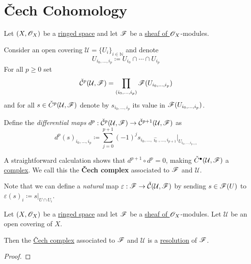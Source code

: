 \documentclass[../../main]{subfiles}
\begin{document}
\chapter{Čech Cohomology}

\begin{definition}\label{def:cech-complex}
  Let \((X, \mathscr{O}_{X})\) be a \hyperref[def:ringed-space]{ringed space} and let \(\mathscr{F}\) be a \hyperref[def:sheaf-of-modules]{sheaf of \(\mathscr{O}_{X}\)}-modules.

  Consider an open covering \(\mathcal{U} = \{U_{i}\}_{i \in \mathbb{N}}\) and denote
  \begin{equation*}
    U_{i_{0}, \ldots, i_{p}} \coloneq U_{i_{0}} \cap \cdots \cap U_{i_{p}}
  \end{equation*}
  For all \(p \geq 0\) set
  \begin{equation*}
    \check{\mathcal{C}}^{p}(\mathcal{U}, \mathscr{F}) = \prod_{(i_{0}, \ldots, i_{p})} \mathscr{F}(U_{i_{0}, \ldots, i_{p}})
  \end{equation*}
  and for all \(s \in \check{C}^{p}(\mathcal{U}, \mathscr{F})\) denote by \(s_{i_{0}, \ldots, i_{p}}\) its value in \(\mathscr{F}(U_{i_{0}, \ldots, i_{p}})\).

  Define the \textit{differential maps} \(d^{p}: \check{\mathcal{C}}^{p}(\mathcal{U}, \mathscr{F}) \to \check{\mathcal{C}}^{p+1}(\mathcal{U}, \mathscr{F})\) as
  \begin{equation*}
    d^{p}(s)_{i_{0}, \ldots, i_{p}} \coloneq \sum_{j=0}^{p+1} (-1)^{j} s_{i_{0}, \ldots, \hat{\imath_{0}}, \ldots, i_{p+1}}|_{U_{i_{0}, \ldots, i_{p+1}}}
  \end{equation*}

  A straightforward calculation shows that \(d^{p+1} \circ d^{p} = 0\), making \(\check{C}^{\bullet}(\mathcal{U}, \mathscr{F})\) a \hyperref[def:complex]{complex}.
  We call this the \textbf{\v{C}ech complex} associated to \(\mathscr{F}\) and \(\mathcal{U}\).

  Note that we can define a \textit{natural} map \(\varepsilon: \mathscr{F} \to \check{\mathcal{C}}(\mathcal{U}, \mathscr{F})\) by sending \(s \in \mathscr{F}(U)\) to \(\varepsilon(s)_{i} \coloneq s|_{U \cap U_{i}}\).
\end{definition}

\begin{proposition}\label{prop:cech-complex-is-resolution}
  Let \((X, \mathscr{O}_{X})\) be a \hyperref[def:ringed-space]{ringed space} and let \(\mathscr{F}\) be a \hyperref[def:sheaf-of-modules]{sheaf of \(\mathscr{O}_{X}\)}-modules.
  Let \(\mathcal{U}\) be an open covering of \(X\).

  Then the \hyperref[def:cech-complex]{\v{C}ech complex} associated to \(\mathscr{F}\) and \(\mathcal{U}\) is a \hyperref[def:resolution]{resolution} of \(\mathscr{F}\).
\end{proposition}
\begin{proof}
\end{proof}
\end{document}
